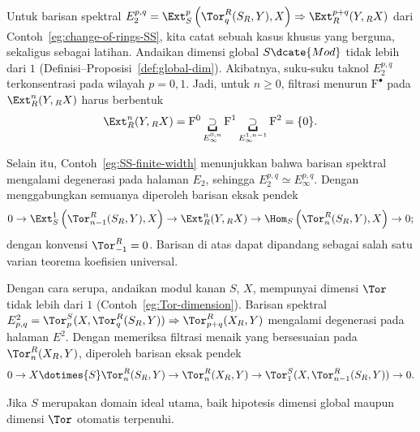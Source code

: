 \begin{example}\label{eg:change-of-rings-SS-bis}
	Untuk barisan spektral
	$E_2^{p,q}=\Ext_S^p\left(\Tor^R_q(S_R,Y),X\right)
	\Rightarrow\Ext_R^{p+q}(Y,{}_RX)$ dari
	Contoh~\ref{eg:change-of-rings-SS}, kita catat sebuah kasus khusus yang
	berguna, sekaligus sebagai latihan. Andaikan dimensi global
	$S\dcate{Mod}$ tidak lebih dari $1$
	(Definisi--Proposisi~\ref{def:global-dim}). Akibatnya, suku-suku taknol
	$E_2^{p,q}$ terkonsentrasi pada wilayah $p=0,1$. Jadi, untuk $n\geq0$,
	filtrasi menurun $\mathrm{F}^\bullet$ pada $\Ext_R^n(Y,{}_RX)$ harus
	berbentuk
	\[ \Ext_R^n(Y, {}_R X) = \mathrm{F}^0 \underbracket{\supset}_{E_\infty^{0, n}} \mathrm{F}^1 \underbracket{\supset}_{E_\infty^{1, n-1}} \mathrm{F}^2 = \{0\}. \]

	Selain itu, Contoh~\ref{eg:SS-finite-width} menunjukkan bahwa barisan
	spektral mengalami degenerasi pada halaman $E_2$, sehingga
	$E_2^{p,q}\simeq E_\infty^{p,q}$. Dengan menggabungkan semuanya diperoleh
	barisan eksak pendek
	\[ 0 \to \Ext_S^1\left( \Tor^R_{n-1}(S_R, Y), X \right) \to \Ext_R^n(Y, {}_R X) \to \Hom_S\left( \Tor^R_n(S_R, Y), X \right) \to 0; \]
	dengan konvensi $\Tor^R_{-1}=0$. Barisan di atas dapat dipandang sebagai
	salah satu varian teorema koefisien universal.

	Dengan cara serupa, andaikan modul kanan $S$, $X$, mempunyai dimensi $\Tor$
	tidak lebih dari $1$ (Contoh~\ref{eg:Tor-dimension}). Barisan spektral
	$E^2_{p,q}=\Tor^S_p(X,\Tor^R_q(S_R,Y))
	\Rightarrow\Tor^R_{p+q}(X_R,Y)$ mengalami degenerasi pada halaman $E^2$.
	Dengan memeriksa filtrasi menaik yang bersesuaian pada
	$\Tor^R_n(X_R,Y)$, diperoleh barisan eksak pendek
	\[ 0 \to X \dotimes{S} \Tor^R_n(S_R, Y) \to \Tor^R_n(X_R, Y) \to \Tor^S_1(X, \Tor^R_{n-1}(S_R, Y)) \to 0. \]

	Jika $S$ merupakan domain ideal utama, baik hipotesis dimensi global maupun
	dimensi $\Tor$ otomatis terpenuhi.
\end{example}
